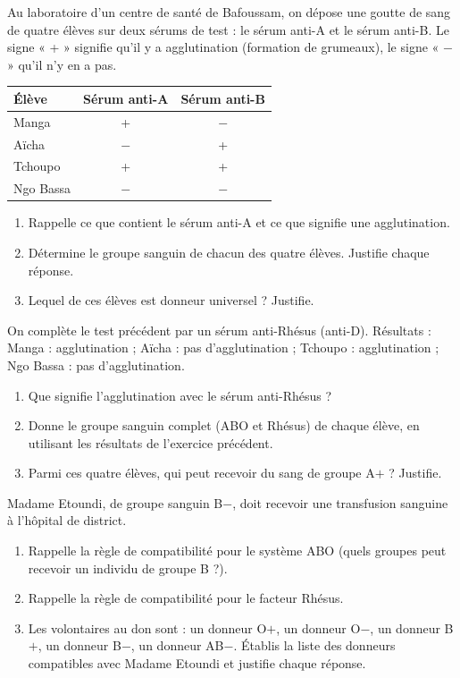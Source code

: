 \documentclass[11pt]{article}
\begin{document}
\begin{exercice}
Au laboratoire d'un centre de santé de Bafoussam, on dépose une goutte de sang de quatre élèves sur deux sérums de test : le sérum anti-A et le sérum anti-B. Le signe « + » signifie qu'il y a agglutination (formation de grumeaux), le signe « $-$ » qu'il n'y en a pas.
\begin{center}
\begin{tabular}{|l|c|c|}
\hline
\rowcolor{popblueL} \textbf{Élève} & \textbf{Sérum anti-A} & \textbf{Sérum anti-B} \\
\hline
Manga & + & $-$ \\
\hline
Aïcha & $-$ & + \\
\hline
Tchoupo & + & + \\
\hline
Ngo Bassa & $-$ & $-$ \\
\hline
\end{tabular}
\end{center}
\begin{enumerate}
\item Rappelle ce que contient le sérum anti-A et ce que signifie une agglutination.
\item Détermine le groupe sanguin de chacun des quatre élèves. Justifie chaque réponse.
\item Lequel de ces élèves est donneur universel ? Justifie.
\end{enumerate}
\end{exercice}

\begin{exercice}
On complète le test précédent par un sérum anti-Rhésus (anti-D). Résultats : Manga : agglutination ; Aïcha : pas d'agglutination ; Tchoupo : agglutination ; Ngo Bassa : pas d'agglutination.
\begin{enumerate}
\item Que signifie l'agglutination avec le sérum anti-Rhésus ?
\item Donne le groupe sanguin complet (ABO et Rhésus) de chaque élève, en utilisant les résultats de l'exercice précédent.
\item Parmi ces quatre élèves, qui peut recevoir du sang de groupe A$+$ ? Justifie.
\end{enumerate}
\end{exercice}

\begin{exercice}
Madame Etoundi, de groupe sanguin B$-$, doit recevoir une transfusion sanguine à l'hôpital de district.
\begin{enumerate}
\item Rappelle la règle de compatibilité pour le système ABO (quels groupes peut recevoir un individu de groupe B ?).
\item Rappelle la règle de compatibilité pour le facteur Rhésus.
\item Les volontaires au don sont : un donneur O$+$, un donneur O$-$, un donneur B$+$, un donneur B$-$, un donneur AB$-$. Établis la liste des donneurs compatibles avec Madame Etoundi et justifie chaque réponse.
\end{enumerate}
\end{exercice}
\end{document}

